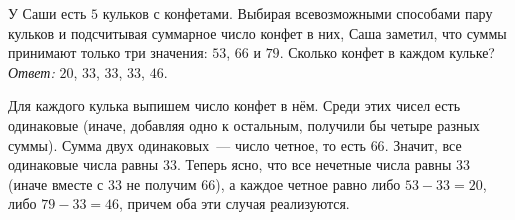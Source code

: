 \problem{}
У Саши есть $5$ кульков с конфетами.
Выбирая всевозможными способами пару кульков и подсчитывая суммарное число
конфет в них, Саша заметил, что суммы принимают только три значения:
$53$, $66$ и $79$.
Сколько конфет в каждом кульке?
\solution
\emph{Ответ:} $20$, $33$, $33$, $33$, $46$.
\par
Для каждого кулька выпишем число конфет в нём.
Среди этих чисел есть одинаковые
(иначе, добавляя одно к остальным, получили бы четыре разных суммы).
Сумма двух одинаковых~--- число четное, то есть $66$.
Значит, все одинаковые числа равны $33$.
Теперь ясно, что все нечетные числа равны $33$
(иначе вместе с $33$ не получим $66$), а каждое четное равно
либо $53 - 33 = 20$, либо $79 - 33 = 46$, причем оба эти случая реализуются.
\endproblem
